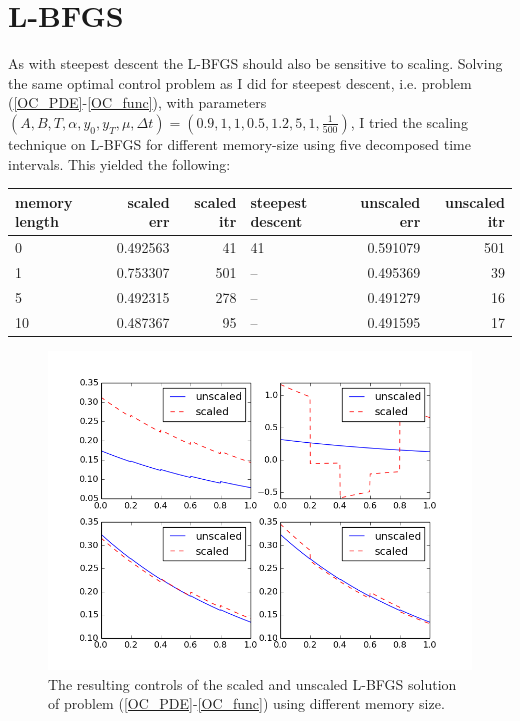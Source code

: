 \documentclass[11pt,a4paper]{article}
\begin{document}
\section{L-BFGS}
As with steepest descent the L-BFGS should also be sensitive to scaling. Solving the same optimal control problem as I did for steepest descent, i.e. problem (\ref{OC_PDE}-\ref{OC_func}), with parameters $(A,B,T,\alpha,y_0,y_T,\mu,\Delta t)=(0.9,1,1,0.5,1.2,5,1,\frac{1}{500})$, I tried the scaling technique on L-BFGS for different memory-size using five decomposed time intervals. This yielded the following:
\\
\begin{tabular}{lrrlrr}
\toprule
{} memory length &  scaled err &  scaled itr & steepest descent &  unscaled err &  unscaled itr \\
\midrule
0  &    0.492563 &          41 &               41 &      0.591079 &           501 \\
1  &    0.753307 &         501 &               -- &      0.495369 &            39 \\
5  &    0.492315 &         278 &               -- &      0.491279 &            16 \\
10 &    0.487367 &          95 &               -- &      0.491595 &            17 \\
\bottomrule
\end{tabular} 
 \begin{figure}
  \includegraphics[width=\linewidth]{scale_mem_lim.png}
  \caption{The resulting controls of the scaled and unscaled L-BFGS solution of problem (\ref{OC_PDE}-\ref{OC_func}) using different memory size.} 
  \label{Fig 1}
\end{figure}
\end{document}
